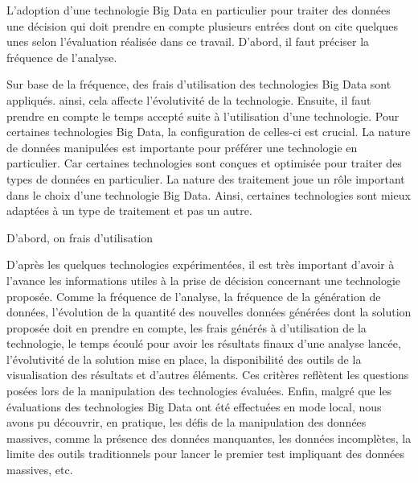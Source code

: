 L'adoption d'une technologie Big Data en particulier pour traiter des données une décision qui doit prendre en compte plusieurs entrées dont on cite quelques unes selon l'évaluation réalisée dans ce travail. D'abord, il faut préciser la fréquence de l'analyse. 

 Sur base de la fréquence, des frais d'utilisation des technologies Big Data sont appliqués. ainsi, cela affecte l'évolutivité de la technologie.  Ensuite, il faut prendre en compte  le temps  accepté   suite à l'utilisation d'une technologie. Pour certaines technologies Big Data, la configuration de celles-ci est crucial. La nature de données manipulées est importante pour préférer une technologie en particulier. Car certaines technologies sont conçues  et optimisée pour traiter des types de données en particulier. La nature des traitement joue un rôle important dans le choix d'une technologie Big Data. Ainsi, certaines technologies sont mieux adaptées à un type de traitement et pas un autre.



D'abord, on  frais d'utilisation

D'après les quelques technologies expérimentées, il est très important d'avoir à l'avance les informations utiles à la prise de décision concernant une technologie proposée.  Comme la fréquence de l'analyse, la fréquence de la génération de données, l'évolution de la quantité des nouvelles données générées dont la solution proposée doit en prendre en compte, les frais générés  à d'utilisation de la technologie, le temps écoulé pour avoir les résultats finaux d'une analyse lancée, l'évolutivité de la solution mise en place, la disponibilité des outils de la visualisation des résultats et d'autres éléments. Ces critères reflètent les questions posées lors de la  manipulation des technologies évaluées.  Enfin, malgré que les  évaluations des technologies Big Data ont été effectuées en mode local, nous avons pu découvrir, en pratique, les défis de la manipulation des données massives, comme la présence des données manquantes, les données incomplètes,  la limite des outils traditionnels pour lancer le premier test impliquant des données massives, etc. 

